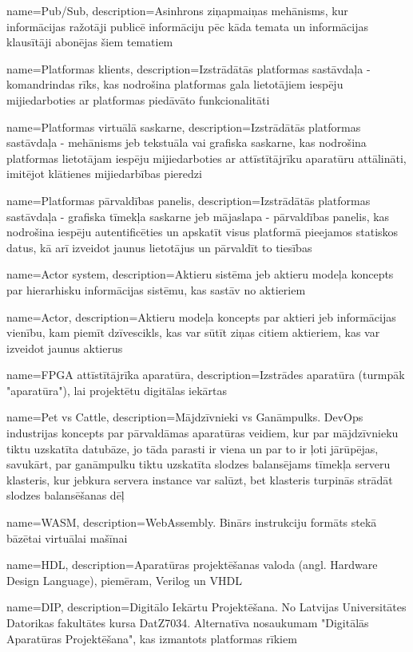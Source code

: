 {
    name=Pub/Sub,
    description={Asinhrons ziņapmaiņas mehānisms, kur informācijas ražotāji publicē informāciju pēc kāda temata 
        un informācijas klausītāji abonējas šiem tematiem}
}

{
    name=Platformas klients,
    description={Izstrādātās platformas sastāvdaļa - komandrindas rīks, kas nodrošina platformas gala lietotājiem
        iespēju mijiedarboties ar platformas piedāvāto funkcionalitāti}
}

{
    name=Platformas virtuālā saskarne,
    description={Izstrādātās platformas sastāvdaļa - mehānisms jeb tekstuāla vai grafiska saskarne, kas nodrošina 
        platformas lietotājam iespēju mijiedarboties ar attīstītājrīku aparatūru attālināti, imitējot klātienes 
        mijiedarbības pieredzi}
}

{
    name=Platformas pārvaldības panelis,
    description={Izstrādātās platformas sastāvdaļa - grafiska tīmekļa saskarne jeb mājaslapa - pārvaldības panelis, 
        kas nodrošina iespēju autentificēties un apskatīt visus platformā pieejamos statiskos datus, kā arī izveidot
        jaunus lietotājus un pārvaldīt to tiesības}
}

{
    name=Actor system,
    description={Aktieru sistēma jeb aktieru modeļa koncepts par hierarhisku informācijas sistēmu, kas sastāv no aktieriem}
}

{
    name=Actor,
    description={Aktieru modeļa koncepts par aktieri jeb informācijas vienību, kam piemīt dzīvescikls, 
        kas var sūtīt ziņas citiem aktieriem, kas var izveidot jaunus aktierus}
}

{
    name=FPGA attīstītājrīka aparatūra,
    description={Izstrādes aparatūra (turmpāk "aparatūra"), lai projektētu digitālas iekārtas}
}

{
    name=Pet vs Cattle,
    description={Mājdzīvnieki vs Ganāmpulks. DevOps industrijas koncepts par pārvaldāmas aparatūras veidiem, kur
        par mājdzīvnieku tiktu uzskatīta datubāze, jo tāda parasti ir viena un par to ir ļoti jārūpējas, savukārt,
        par ganāmpulku tiktu uzskatīta slodzes balansējams tīmekļa serveru klasteris, kur jebkura servera instance
        var salūzt, bet klasteris turpinās strādāt slodzes balansēšanas dēļ}
}

{
    name=WASM,
    description={WebAssembly. Binārs instrukciju formāts stekā bāzētai virtuālai mašīnai}
}

{
    name=HDL,
    description={Aparatūras projektēšanas valoda (angl. Hardware Design Language), piemēram, Verilog un VHDL}
}

{
    name=DIP,
    description={Digitālo Iekārtu Projektēšana. No Latvijas Universitātes Datorikas fakultātes kursa DatZ7034. 
        Alternatīva nosaukumam "Digitālās Aparatūras Projektēšana", kas izmantots platformas rīkiem}
}